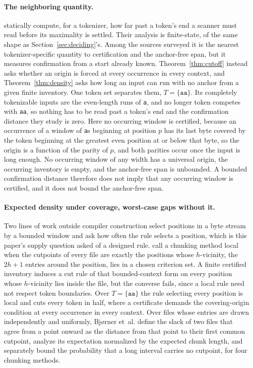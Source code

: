 \documentclass[11pt,a4paper]{article}
\theoremstyle{definition}
\theoremstyle{plain}
\newcommand{\code}[1]{\texttt{#1}}
\begin{document}
\paragraph{The neighboring quantity.} \citet{li2026streaming} statically compute, for a tokenizer, how far past a
token's end a scanner must read before its maximality is settled. Their analysis is finite-state, of the same shape as
Section~\ref{sec:deciding}'s. Among the sources surveyed it is the nearest tokenizer-specific quantity to certification
and the anchor-free span, but it measures confirmation from a start already known. Theorem~\ref{thm:cutoff} instead asks
whether an origin is forced at every occurrence in every context, and Theorem~\ref{thm:density} asks how long an input
can run with no anchor from a given finite inventory. One token set separates them, $T = \{\code{aa}\}$. Its completely
tokenizable inputs are the even-length runs of \code{a}, and no longer token competes with \code{aa}, so nothing has to
be read past a token's end and the confirmation distance they study is zero. Here no occurring window is certified,
because an occurrence of a window of \code{a}s beginning at position $p$ has its last byte covered by the token
beginning at the greatest even position at or below that byte, so the origin is a function of the parity of $p$, and
both parities occur once the input is long enough. No occurring window of any width has a universal origin, the
occurring inventory is empty, and the anchor-free span is unbounded. A bounded confirmation distance therefore does not
imply that any occurring window is certified, and it does not bound the anchor-free span.

\paragraph{Expected density under coverage, worst-case gaps without it.} Two lines of work outside compiler construction
select positions in a byte stream by a bounded window and ask how often the rule selects a position, which is this
paper's supply question asked of a designed rule. \citet{bjorner2010chunking} call a chunking method local when the
cutpoints of every file are exactly the positions whose $h$-vicinity, the $2h + 1$ entries around the position, lies in
a chosen criterion set. A finite certified inventory induces a cut rule of that bounded-context form on every position
whose $h$-vicinity lies inside the file, but the converse fails, since a local rule need not respect token boundaries.
Over $T = \{\code{aa}\}$ the rule selecting every position is local and cuts every token in half, where a certificate
demands the covering-origin condition at every occurrence in every context. Over files whose entries are drawn
independently and uniformly, Bj{\o}rner et~al. define the slack of two files that agree from a point onward as the
distance from that point to their first common cutpoint, analyze its expectation normalized by the expected chunk
length, and separately bound the probability that a long interval carries no cutpoint, for four chunking methods.
\end{document}
